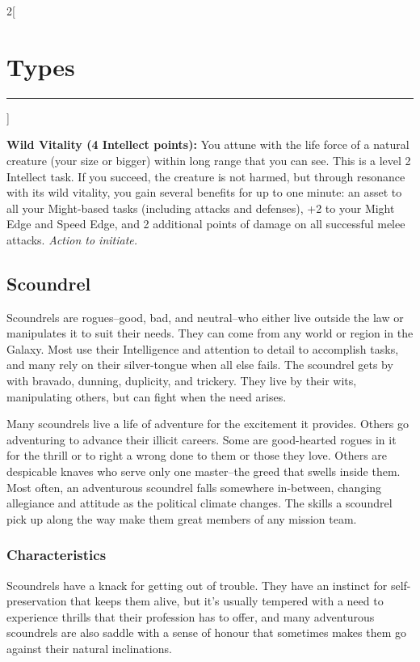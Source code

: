 \documentclass[a4paper,10pt,final]{book}
\newcommand{\HRule}{\rule{\linewidth}{0.5mm}} %
\newcommand{\newSection}[1]{\section*{#1} \addcontentsline{toc}{section}{#1} \label{sec:#1} \HRule}
\newcommand{\itemAbility}[2]{\textcolor{25gray}{\textbullet\textbf{ #1:}} {#2}\par}
\newcommand{\actionInit}{\textit{ Action to initiate.}}
\newenvironment{docsection}[1]
{
  \begin{multicols*}{2}[\newSection{#1}]
}
{
  \end{multicols*}
  \newpage
}
\begin{document}
\begin{docsection}{Types}
\itemAbility{Wild Vitality (4 Intellect points)}{You attune with the life force of a natural creature (your size or bigger) within long range that you can see. This is a level 2 Intellect task. If you succeed, the creature is not harmed, but through resonance with its wild vitality, you gain several benefits for up to one minute: an asset to all your Might-based tasks (including attacks and defenses), +2 to your Might Edge and Speed Edge, and 2 additional points of damage on all successful melee attacks.\actionInit}

\newpage


%
%
%
%
%
%
%
%
%
%
%
%
%
%
%
%
%
%
%


\subsection*{Scoundrel} %
\label{sub:scoundrel}
Scoundrels are rogues--good, bad, and neutral--who either live outside the law or manipulates it to suit their needs. They can come from any world or region in the Galaxy. Most use their Intelligence and attention to detail to accomplish tasks, and many rely on their silver-tongue when all else fails. The scoundrel gets by with bravado, dunning, duplicity, and trickery. They live by their wits, manipulating others, but can fight when the need arises.\par

Many scoundrels live a life of adventure for the excitement it provides. Others go adventuring to advance their illicit careers. Some are good-hearted rogues in it for the thrill or to right a wrong done to them or those they love. Others are despicable knaves who serve only one master--the greed that swells inside them. Most often, an adventurous scoundrel falls somewhere in-between, changing allegiance and attitude as the political climate changes. The skills a scoundrel pick up along the way make them great members of any mission team.

\subsubsection*{Characteristics}
\label{subsub:scoundrelCharacteristics}
Scoundrels have a knack for getting out of trouble. They have an instinct for self-preservation that keeps them alive, but it's usually tempered with a need to experience thrills that their profession has to offer, and many adventurous scoundrels are also saddle with a sense of honour that sometimes makes them go against their natural inclinations. \par


\end{docsection}
\end{document}
